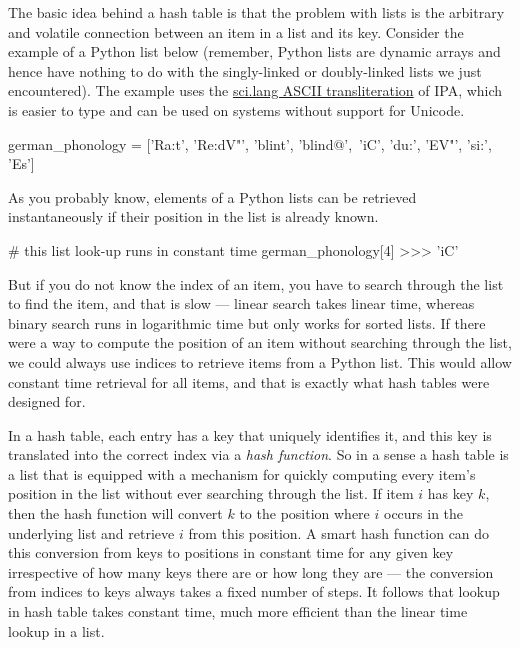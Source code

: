 \begin{programming}
The basic idea behind a hash table is that the problem with lists is the arbitrary and volatile connection between an item in a list and its key.
Consider the example of a Python list below (remember, Python lists are dynamic arrays and hence have nothing to do with the singly-linked or doubly-linked lists we just encountered).
The example uses the \href{http://www.kirshenbaum.net/IPA/ascii-ipa.pdf}{sci.lang ASCII transliteration} of IPA, which is easier to type and can be used on systems without support for Unicode.
%
\begin{center}
\begin{pythoncode}
    german_phonology = ['Ra:t', 'Re:dV"', 'blint', 'blind@',\
                        'iC', 'du:', 'EV"', 'si:', 'Es']
\end{pythoncode}
\end{center}
%
As you probably know, elements of a Python lists can be retrieved instantaneously if their position in the list is already known.
%
\begin{center}
\begin{pythoncode}
    # this list look-up runs in constant time
    german_phonology[4]
    >>> 'iC'
\end{pythoncode}
\end{center}
%
But if you do not know the index of an item, you have to search through the list to find the item, and that is slow --- linear search takes linear time, whereas binary search runs in logarithmic time but only works for sorted lists.
If there were a way to compute the position of an item without searching through the list, we could always use indices to retrieve items from a Python list.
This would allow constant time retrieval for all items, and that is exactly what hash tables were designed for.

In a hash table, each entry has a key that uniquely identifies it, and this key is translated into the correct index via a \emph{hash function}.
So in a sense a hash table is a list that is equipped with a mechanism for quickly computing every item's position in the list without ever searching through the list.
If item $i$ has key $k$, then the hash function will convert $k$ to the position where $i$ occurs in the underlying list and retrieve $i$ from this position.
A smart hash function can do this conversion from keys to positions in constant time for any given key irrespective of how many keys there are or how long they are --- the conversion from indices to keys always takes a fixed number of steps.
It follows that lookup in hash table takes constant time, much more efficient than the linear time lookup in a list.


\end{programming}
